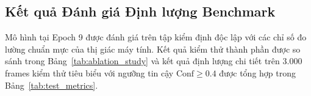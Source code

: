 \documentclass[11pt,a4paper]{article}
\begin{document}
\subsection{Kết quả Đánh giá Định lượng Benchmark}
Mô hình tại Epoch 9 được đánh giá trên tập kiểm định độc lập với các chỉ số đo lường chuẩn mực của thị giác máy tính. Kết quả kiểm thử thành phần được so sánh trong Bảng~\ref{tab:ablation_study} và kết quả định lượng chi tiết trên 3.000 frames kiểm thử tiêu biểu với ngưỡng tin cậy $\text{Conf} \ge 0.4$ được tổng hợp trong Bảng~\ref{tab:test_metrics}.

\begin{table}[H]
\centering
\caption{Bảng đánh giá đóng góp của từng thành phần cải tiến (Ablation Study) trên tập kiểm định Anti-UAV.}
\label{tab:ablation_study}
\end{table}
\end{document}

